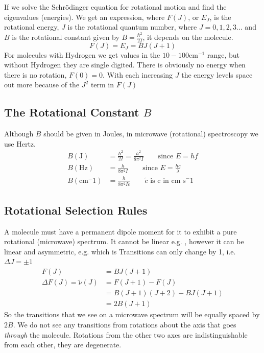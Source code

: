 \documentclass{article}
\newcommand{\cm}{cm\(^{-1}\) }
\begin{document}
    If we solve the Schr{\"o}dinger equation for rotational motion and find the eigenvalues (energies).
    We get an expression, where $F(J)$, or $E_J$, is the rotational energy, $J$ is the rotational quantum number,
    where $J = 0, 1, 2, 3...$ and $B$ is the rotational constant given by $B = \frac{\hbar^2}{2I}$, it depends 
    on the molecule. 
    $$F(J) = E_J = BJ(J+1)$$
    For molecules with Hydrogen we get values in the $10-100$\cm range, but without Hydrogen they are single
    digited. There is obviously no energy when there is no rotation, $F(0) = 0$. With each increasing $J$ the
    energy levels space out more because of the $J^2$ term in $F(J)$

    \subsection{The Rotational Constant $B$}
    Although $B$ should be given in Joules, in microwave (rotational) spectroscopy we use Hertz. 
    \begin{align*}
        B (\text{J}) &= \frac{\hbar^2}{2I} = \frac{h^2}{8\pi^2I} \qquad \text{since } E = hf\\
        B (\text{Hz}) &= \frac{h}{8\pi^2I} \qquad \text{since } E = \frac{hc}{\lambda}\\
        B (\text{cm}^-1) &= \frac{h}{8\pi^2I\tilde{c}} \qquad \tilde{c} \text{ is c in cm s}^-1
    \end{align*}

    \subsection{Rotational Selection Rules}
    A molecule must have a permanent dipole moment for it to exhibit a pure rotational (microwave) spectrum.
    It cannot be linear e.g. , however it can be linear and asymmetric, e.g.  which is 
    Transitions can only change by 1, i.e. $\Delta J = \pm 1$ 
    \begin{align*}
        F(J) &= BJ(J+1)\\
        \Delta F(J) = \tilde{\nu}(J) &= F(J+1) - F(J)\\
        &= B(J+1)(J+2) - BJ(J+1)\\
        &= 2B(J+1)
    \end{align*}
    So the transitions that we see on a microwave spectrum will be equally spaced by $2B$. We do not see 
    any transitions from rotations about the axis that goes \emph{through} the molecule. Rotations from the other
    two axes are indistinguishable from each other, they are degenerate. \\
\end{document}
